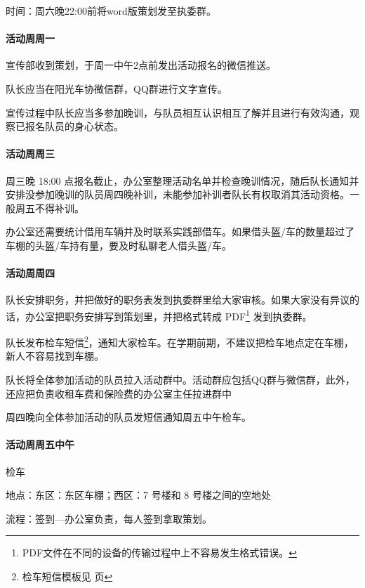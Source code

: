 \documentclass{ctexbook}
\begin{document}
时间：周六晚22:00前将word版策划发至执委群。

\paragraph{活动周周一}

宣传部收到策划，于周一中午2点前发出活动报名的微信推送。

队长应当在阳光车协微信群，QQ群进行文字宣传。

宣传过程中队长应当多参加晚训，与队员相互认识相互了解并且进行有效沟通，观察已报名队员的身心状态。

\paragraph{活动周周三}

周三晚 18:00 点报名截止，办公室整理活动名单并检查晚训情况，随后队长通知并安排没参加晚训的队员周四晚补训，未能参加补训者队长有权取消其活动资格。一般周五不得补训。

办公室还需要统计借用车辆并及时联系实践部借车。如果借头盔/车的数量超过了车棚的头盔/车持有量，要及时私聊老人借头盔/车。

\paragraph{活动周周四}

队长安排职务，并把做好的职务表发到执委群里给大家审核。如果大家没有异议的话，办公室把职务安排写到策划里，并把格式转成 PDF\footnote{PDF文件在不同的设备的传输过程中上不容易发生格式错误。} 发到执委群。



队长发布检车短信\footnote{检车短信模板见 \pageref{subsec:检车通知} 页}，通知大家检车。在学期前期，不建议把检车地点定在车棚，新人不容易找到车棚。

队长将全体参加活动的队员拉入活动群中。活动群应包括QQ群与微信群，此外，还应把负责收租车费和保险费的办公室主任拉进群中

周四晚向全体参加活动的队员发短信通知周五中午检车。

\paragraph{活动周周五中午}

检车

地点：东区：东区车棚；西区：7 号楼和 8 号楼之间的空地处

流程：签到—办公室负责，每人签到拿取策划。
\end{document}
